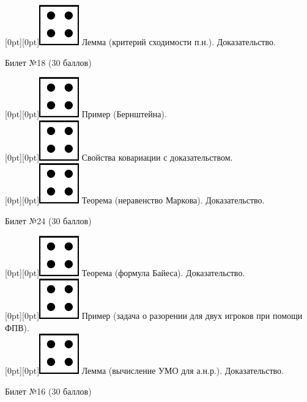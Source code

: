 \documentclass[10pt]{article}
\begin{document}
\raisebox{-1pt}[0pt][0pt]{\includegraphics[width=0.02\linewidth]{4.png}} Лемма (критерий сходимости п.н.). Доказательство. \\

\begin{center} {\Large Билет №18 (30 баллов)} \end{center}

\raisebox{-1pt}[0pt][0pt]{\includegraphics[width=0.02\linewidth]{4.png}}  Пример (Бернштейна). \\

\raisebox{-1pt}[0pt][0pt]{\includegraphics[width=0.02\linewidth]{4.png}} Свойства ковариации с доказательством. \\

\raisebox{-1pt}[0pt][0pt]{\includegraphics[width=0.02\linewidth]{4.png}} Теорема (неравенство Маркова). Доказательство. \\

\begin{center} {\Large Билет №24 (30 баллов)} \end{center}

\raisebox{-1pt}[0pt][0pt]{\includegraphics[width=0.02\linewidth]{4.png}} Теорема (формула Байеса). Доказательство. \\

\raisebox{-1pt}[0pt][0pt]{\includegraphics[width=0.02\linewidth]{4.png}} Пример (задача о разорении для двух игроков при помощи ФПВ). \\ 

\raisebox{-1pt}[0pt][0pt]{\includegraphics[width=0.02\linewidth]{4.png}} Лемма (вычисление УМО для а.н.р.). Доказательство. \\

\begin{center} {\Large Билет №16 (30 баллов)} \end{center}
\end{document}
